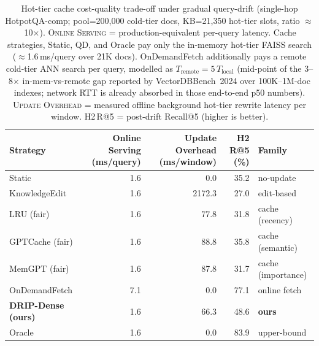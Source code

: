 \begin{table}[t]
\centering
\small
\caption{Hot-tier cache cost-quality trade-off under gradual query-drift (single-hop HotpotQA-comp; pool=200{,}000 cold-tier docs, KB=21{,}350 hot-tier slots, ratio $\approx$\,10$\times$). \textsc{Online Serving} = production-equivalent per-query latency. Cache strategies, Static, QD, and Oracle pay only the in-memory hot-tier FAISS search ($\approx$1.6\,ms/query over 21K docs). OnDemandFetch additionally pays a remote cold-tier ANN search per query, modelled as $T_{\text{remote}}=5\,T_{\text{local}}$ (mid-point of the 3--8$\times$ in-mem-vs-remote gap reported by VectorDBBench~2024 over 100K--1M-doc indexes; network RTT is already absorbed in those end-to-end p50 numbers). \textsc{Update Overhead} = measured offline background hot-tier rewrite latency per window. H2\,R@5 = post-drift Recall@5 (higher is better).}
\label{tab:system_metrics}
\setlength{\tabcolsep}{6pt}
\begin{tabular}{lrrrl}
\toprule
Strategy & Online Serving (ms/query) & Update Overhead (ms/window) & H2 R@5 (\%) & Family \\
\midrule
  Static &    1.6 &    0.0 &  35.2 & no-update \\
  KnowledgeEdit &    1.6 & 2172.3 &  27.0 & edit-based \\
  LRU (fair) &    1.6 &   77.8 &  31.8 & cache (recency) \\
  GPTCache (fair) &    1.6 &   88.8 &  35.8 & cache (semantic) \\
  MemGPT (fair) &    1.6 &   87.8 &  31.7 & cache (importance) \\
  OnDemandFetch &    7.1 &    0.0 &  77.1 & online fetch \\
  \textbf{DRIP-Dense (ours)} &    1.6 &   66.3 &  48.6 & \textbf{ours} \\
  Oracle &    1.6 &    0.0 &  83.9 & upper-bound \\
\bottomrule
\end{tabular}
\end{table}
